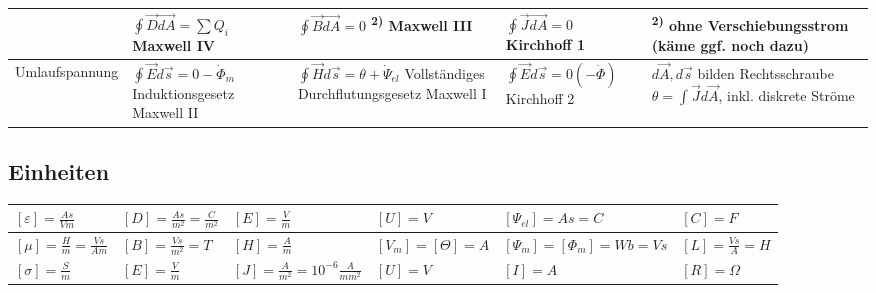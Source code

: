 \begin{tabular}{|p{2.5cm}||p{2.7cm}|p{4cm}|p{2.7cm}|p{5cm}|}
		& \parbox{2.7cm}{
			\vspace{.1cm}$\oint\vec{D}\vec{dA}=\sum Q_i$ \vspace{.1cm}
			Maxwell IV
			\vspace{.1cm}}
		& \parbox{4cm}{
			\vspace{.1cm}$\oint\vec{B}\vec{dA}=0$
			\textsuperscript{2)} \\
			Maxwell III
			\vspace{.1cm}} 
		& \parbox{2.7cm}{
			$\oint\vec{J}\vec{dA}=0$\\
			Kirchhoff 1}
		& \parbox{5cm}{\textsuperscript{2)} ohne Verschiebungsstrom (käme ggf. noch
		dazu)} \\
	\hline
	Umlaufspannung 
		& \parbox{2.7cm}{
			\vspace{.1cm}
			$\oint\vec{E}d\vec{s}=0-\dot{\Phi}_m$ \\ 
			{\tiny Induktionsgesetz}\\Maxwell II
			\vspace{.1cm}}
		& \parbox{4cm}{
			\vspace{.1cm}
			$\oint\vec{H}d\vec{s}=\theta+\dot{\Psi}_{el}$ \\ 
			{\tiny Vollständiges Durchflutungsgesetz} \\Maxwell I
			\vspace{.1cm}}
		& \parbox{2.7cm}{
			\vspace{.1cm}
			$\oint\vec{E}d\vec{s}=0(-\dot{\Phi})$ \\ Kirchhoff 2
			\vspace{.1cm}}
		& \parbox{5cm}{
			\vspace{.1cm} 
			$d\vec{A}, d\vec{s}$ bilden Rechtsschraube\\
			$\theta = \int \vec{J}d\vec{A}$, inkl. diskrete Ströme
		  }\\
	\hline
	\end{tabular}
	
	
\subsection{Einheiten}

	\begin{tabular}{|l|l|l|l|l|l|}
	\hline
	$[\varepsilon] = \frac{As}{Vm}$
		& $[D] = \frac{As}{m^2} = \frac{C}{m^2}$
		& $[E] = \frac{V}{m}$
		& $[U] = V$
		& $[\Psi_{el}] = As = C$
		& $[C] = F$ \\
	\hline
	$[\mu] = \frac{H}{m}=\frac{V s}{A m}$
		& $[B] = \frac{Vs}{m^2} = T$
		& $[H] = \frac{A}{m}$
		& $[V_m] = [\Theta] = A$
		& $[\Psi_m] = [\Phi_m] = Wb = Vs$
		& $[L] = \frac{Vs}{A} = H$ \\
	\hline
	$[\sigma] = \frac{S}{m}$
		& $[E] = \frac{V}{m}$
		& $[J] = \frac{A}{m^2} = 10^{-6} \frac{A}{mm^2}$
		& $[U] = V$
		& $[I] = A$
		& $[R] = \Omega$ \\
	\hline
	\end{tabular}
	

